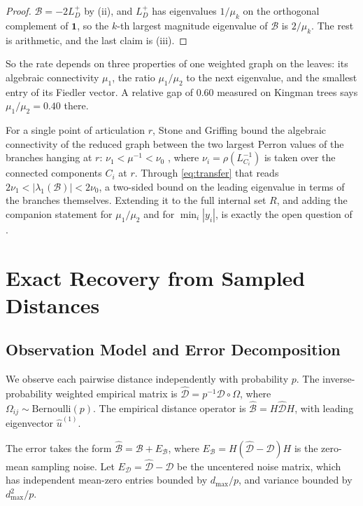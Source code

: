 \documentclass[11pt]{article}
\begin{document}
\begin{proof}
$\mathcal{B} = -2L_D^{+}$ by (ii), and $L_D^{+}$ has eigenvalues
$1/\mu_k$ on the orthogonal complement of $\mathbf{1}$, so the $k$-th largest magnitude
eigenvalue of $\mathcal{B}$ is $2/\mu_k$. The rest is arithmetic, and the last claim is
(iii).
\end{proof}

So the rate depends on three properties of one weighted graph on the leaves: its algebraic
connectivity $\mu_1$, the ratio $\mu_1/\mu_2$ to the next eigenvalue, and the smallest
entry of its Fiedler vector. A relative gap of $0.60$ measured on Kingman trees says
$\mu_1/\mu_2 = 0.40$ there.

For a single point of articulation $r$, Stone and Griffing bound the algebraic connectivity of the reduced graph between the two largest
Perron values of the branches hanging at $r$: $\nu_1 < \mu^{-1} < \nu_0$
\cite[Corollary 2.1]{stone2009fiedler}, where $\nu_i = \rho(L_{C_i}^{-1})$ is taken over
the connected components $C_i$ at $r$. Through \eqref{eq:transfer} that reads
$2\nu_1 < |\lambda_1(\mathcal{B})| < 2\nu_0$, a two-sided bound on the leading eigenvalue
in terms of the branches themselves. Extending it to the full internal set $R$, and adding
the companion statement for $\mu_1/\mu_2$ and for $\min_i |y_i|$, is exactly the open
question of .

\section{Exact Recovery from Sampled Distances}

\subsection{Observation Model and Error Decomposition}

We observe each pairwise distance independently with probability $p$. The inverse-probability weighted empirical matrix is $\hat{\mathcal{D}} = p^{-1} \mathcal{D} \circ \Omega$, where $\Omega_{ij} \sim \text{Bernoulli}(p)$. The empirical distance operator is $\hat{\mathcal{B}} = H\hat{\mathcal{D}}H$, with leading eigenvector $\hat{u}^{(1)}$. 

The error takes the form $\hat{\mathcal{B}} = \mathcal{B} + E_{\mathcal{B}}$, where $E_{\mathcal{B}} = H(\hat{\mathcal{D}} - \mathcal{D})H$ is the zero-mean sampling noise. Let $E_{\mathcal{D}} = \hat{\mathcal{D}} - \mathcal{D}$ be the uncentered noise matrix, which has independent mean-zero entries bounded by $d_{\max}/p$, and variance bounded by $d_{\max}^2/p$.
\end{document}
